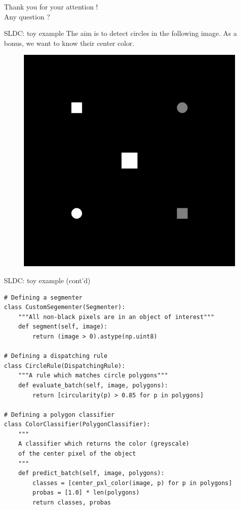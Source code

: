 \documentclass{beamer}
\begin{document}
\begin{frame}
	\vfill
	\begin{center}
		Thank you for your attention ! \\
		Any question ?
	\end{center}
	\vfill
\end{frame}


\begin{frame}{SLDC: toy example}
	The aim is to detect circles in the following image. As a bonus, we want to know their center color.
	\vfill
	\begin{figure}
		\includegraphics[scale=0.04]{images/toy_example.png}
	\end{figure}
	\vfill
\end{frame}

\begin{frame}[fragile]{SLDC: toy example (cont'd)}
\begin{verbatim}
# Defining a segmenter
class CustomSegementer(Segmenter):
    """All non-black pixels are in an object of interest"""
    def segment(self, image):
        return (image > 0).astype(np.uint8)
        
# Defining a dispatching rule 
class CircleRule(DispatchingRule):
    """A rule which matches circle polygons"""
    def evaluate_batch(self, image, polygons):
        return [circularity(p) > 0.85 for p in polygons]

# Defining a polygon classifier
class ColorClassifier(PolygonClassifier):
    """
    A classifier which returns the color (greyscale) 
    of the center pixel of the object
    """
    def predict_batch(self, image, polygons):
        classes = [center_pxl_color(image, p) for p in polygons]
        probas = [1.0] * len(polygons)
        return classes, probas
\end{verbatim}
\end{frame}
\end{document}
